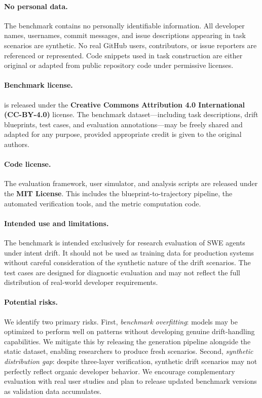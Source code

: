 \paragraph{No personal data.}
The benchmark contains no personally identifiable information. All developer names, usernames, commit messages, and issue descriptions appearing in task scenarios are synthetic. No real GitHub users, contributors, or issue reporters are referenced or represented. Code snippets used in task construction are either original or adapted from public repository code under permissive licenses.

\paragraph{Benchmark license.}
\bench{} is released under the \textbf{Creative Commons Attribution 4.0 International (CC-BY-4.0)} license. The benchmark dataset---including task descriptions, drift blueprints, test cases, and evaluation annotations---may be freely shared and adapted for any purpose, provided appropriate credit is given to the original authors.

\paragraph{Code license.}
The evaluation framework, user simulator, and analysis scripts are released under the \textbf{MIT License}. This includes the blueprint-to-trajectory pipeline, the automated verification tools, and the metric computation code.

\paragraph{Intended use and limitations.}
The benchmark is intended exclusively for research evaluation of SWE agents under intent drift. It should not be used as training data for production systems without careful consideration of the synthetic nature of the drift scenarios. The test cases are designed for diagnostic evaluation and may not reflect the full distribution of real-world developer requirements.

\paragraph{Potential risks.}
We identify two primary risks. First, \emph{benchmark overfitting}: models may be optimized to perform well on \bench{} patterns without developing genuine drift-handling capabilities. We mitigate this by releasing the generation pipeline alongside the static dataset, enabling researchers to produce fresh scenarios. Second, \emph{synthetic distribution gap}: despite three-layer verification, synthetic drift scenarios may not perfectly reflect organic developer behavior. We encourage complementary evaluation with real user studies and plan to release updated benchmark versions as validation data accumulates.
